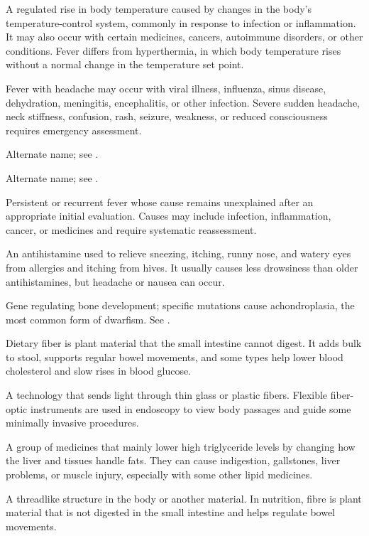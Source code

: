  A regulated rise in body temperature caused by changes in the body's temperature-control system, commonly in response to infection or inflammation. It may also occur with certain medicines, cancers, autoimmune disorders, or other conditions. Fever differs from hyperthermia, in which body temperature rises without a normal change in the temperature set point.

 Fever with headache may occur with viral illness, influenza, sinus disease, dehydration, meningitis, encephalitis, or other infection. Severe sudden headache, neck stiffness, confusion, rash, seizure, weakness, or reduced consciousness requires emergency assessment.

 Alternate name; see .

 Alternate name; see .

 Persistent or recurrent fever whose cause remains unexplained after an appropriate initial evaluation. Causes may include infection, inflammation, cancer, or medicines and require systematic reassessment.

 An antihistamine used to relieve sneezing, itching, runny nose, and watery eyes from allergies and itching from hives. It usually causes less drowsiness than older antihistamines, but headache or nausea can occur.

 Gene regulating bone development; specific mutations cause achondroplasia, the most common form of dwarfism. See .

 Dietary fiber is plant material that the small intestine cannot digest. It adds bulk to stool, supports regular bowel movements, and some types help lower blood cholesterol and slow rises in blood glucose.

 A technology that sends light through thin glass or plastic fibers. Flexible fiber-optic instruments are used in endoscopy to view body passages and guide some minimally invasive procedures.

 A group of medicines that mainly lower high triglyceride levels by changing how the liver and tissues handle fats. They can cause indigestion, gallstones, liver problems, or muscle injury, especially with some other lipid medicines.

 A threadlike structure in the body or another material. In nutrition, fibre is plant material that is not digested in the small intestine and helps regulate bowel movements.

